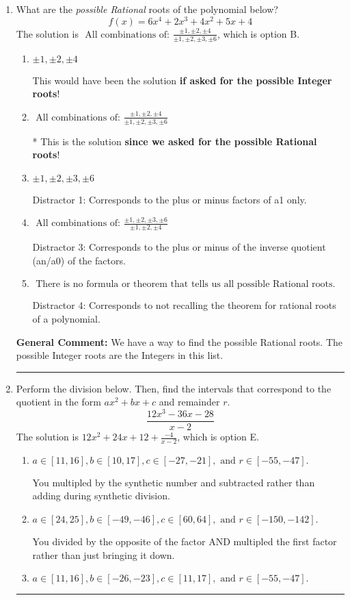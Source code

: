 \documentclass{extbook}[14pt]
\newcommand{\litem}[1]{\item #1

\rule{\textwidth}{0.4pt}}
\begin{document}
\begin{enumerate}\litem{
What are the \textit{possible Rational} roots of the polynomial below?
\[ f(x) = 6x^{4} +2 x^{3} +4 x^{2} +5 x + 4 \]The solution is \( \text{ All combinations of: }\frac{\pm 1,\pm 2,\pm 4}{\pm 1,\pm 2,\pm 3,\pm 6} \), which is option B.\begin{enumerate}[label=\Alph*.]
\item \( \pm 1,\pm 2,\pm 4 \)

This would have been the solution \textbf{if asked for the possible Integer roots}!
\item \( \text{ All combinations of: }\frac{\pm 1,\pm 2,\pm 4}{\pm 1,\pm 2,\pm 3,\pm 6} \)

* This is the solution \textbf{since we asked for the possible Rational roots}!
\item \( \pm 1,\pm 2,\pm 3,\pm 6 \)

 Distractor 1: Corresponds to the plus or minus factors of a1 only.
\item \( \text{ All combinations of: }\frac{\pm 1,\pm 2,\pm 3,\pm 6}{\pm 1,\pm 2,\pm 4} \)

 Distractor 3: Corresponds to the plus or minus of the inverse quotient (an/a0) of the factors. 
\item \( \text{ There is no formula or theorem that tells us all possible Rational roots.} \)

 Distractor 4: Corresponds to not recalling the theorem for rational roots of a polynomial.
\end{enumerate}

\textbf{General Comment:} We have a way to find the possible Rational roots. The possible Integer roots are the Integers in this list.
}
\litem{
Perform the division below. Then, find the intervals that correspond to the quotient in the form $ax^2+bx+c$ and remainder $r$.
\[ \frac{12x^{3} -36 x -28}{x -2} \]The solution is \( 12x^{2} +24 x + 12 + \frac{-4}{x -2} \), which is option E.\begin{enumerate}[label=\Alph*.]
\item \( a \in [11, 16], b \in [10, 17], c \in [-27, -21], \text{ and } r \in [-55, -47]. \)

 You multipled by the synthetic number and subtracted rather than adding during synthetic division.
\item \( a \in [24, 25], b \in [-49, -46], c \in [60, 64], \text{ and } r \in [-150, -142]. \)

 You divided by the opposite of the factor AND multipled the first factor rather than just bringing it down.
\item \( a \in [11, 16], b \in [-26, -23], c \in [11, 17], \text{ and } r \in [-55, -47]. \)


\end{enumerate}}
\end{enumerate}
\end{document}
